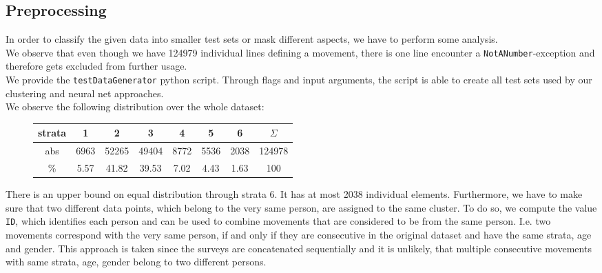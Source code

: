 \subsection{Preprocessing}\label{sec: proprocessing}
	In order to classify the given data into smaller test sets or mask different aspects, we have to perform some analysis.\\
	We observe that even though we have 124979 individual lines defining a movement, there is one line encounter a \texttt{NotANumber}-exception and therefore gets excluded from further usage.	\\
	We provide the \texttt{testDataGenerator} python script. Through flags and input arguments, the script is able to create all test sets used by our clustering and neural net approaches.\\
	We observe the following distribution over the whole dataset:\\
	
	\vspace*{-3em}
	\begin{figure}[H]
		\centering		
		\setlength\tabcolsep{.2cm}
		\begin{tabular}{c|ccccccc}
			strata &  1   &   2   &   3   &  4   &  5   &  6   & $\Sigma$ \\ \hline
			abs   & 6963 & 52265 & 49404 & 8772 & 5536 & 2038 &  124978  \\
			\%   & 5.57 & 41.82 & 39.53 & 7.02 & 4.43 & 1.63 &   100
		\end{tabular}
		\vspace*{-2.5em}
		\label{table: distribution normal}
	\end{figure}
	There is an upper bound on equal distribution through strata 6. It has at most 2038 individual elements.
	Furthermore, we have to make sure that two different data points, which belong to the very same person, are assigned to the same cluster. To do so, we compute the value \texttt{ID}, which identifies each person and can be used to combine movements that are considered to be from the same person. I.e. two movements correspond with the very same person, if and only if they are consecutive in the original dataset and have the same strata, age and gender. This approach is taken since the surveys are concatenated sequentially and it is unlikely, that multiple consecutive movements with same strata, age, gender belong to two different persons.\\
	
